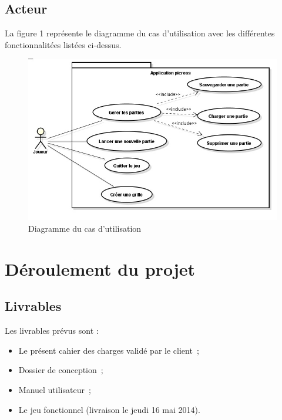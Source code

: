 \documentclass[11pt]{article}
\begin{document}
\newpage
\subsection{Acteur}
	    La figure 1 représente le diagramme du cas d'utilisation avec les différentes fonctionnalitées listées ci-dessus.
	\begin{figure}[!ht]
		\centering
		\includegraphics[]{./Diagrammes/UserCase.jpg}
		\caption{Diagramme du cas d'utilisation}
	\end{figure}

\newpage %

\section{Déroulement du projet}


\subsection{Livrables}

Les livrables prévus sont :

\begin{itemize}
   \item Le présent cahier des charges validé par le client~;
   \item Dossier de conception~;
   \item Manuel utilisateur~;
   \item Le jeu fonctionnel (livraison le jeudi 16 mai 2014).
\end{itemize}
\end{document}
